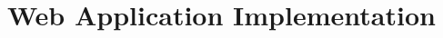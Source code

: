 \chapter{Web Application Implementation}\label{ch:web-application-implementation}

\setimgdir
\minitoc





